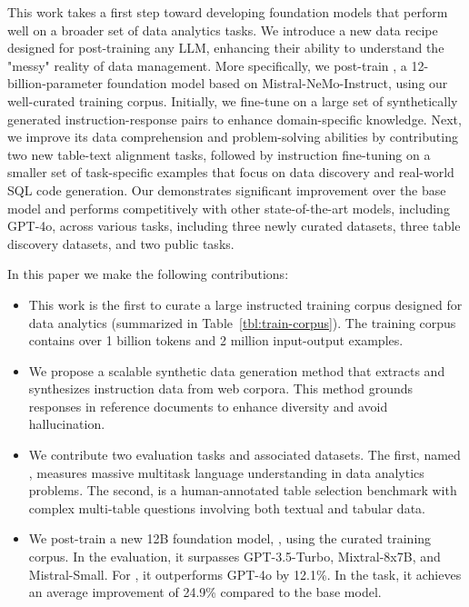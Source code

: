 This work takes a first step toward developing foundation models that perform well on a broader set of data analytics tasks. 
We introduce a new data recipe designed for post-training any LLM, enhancing their ability to understand the "messy" reality of data management. More specifically, we post-train \modelname, a 12-billion-parameter foundation model based on Mistral-NeMo-Instruct, using our well-curated training corpus. Initially, we fine-tune \modelname on a large set of synthetically generated instruction-response pairs to enhance domain-specific knowledge. Next, we improve its data comprehension and problem-solving abilities by contributing two new table-text alignment tasks, followed by instruction fine-tuning on a smaller set of task-specific examples that focus on data discovery and real-world SQL code generation. Our \modelname demonstrates significant improvement over the base model and performs competitively with other state-of-the-art models, including GPT-4o, across various tasks, including three newly curated \mmlu datasets, three table discovery datasets, and two public \texttosql tasks. 


\newpage
\noindent In this paper we make the following contributions:
\vspace{-3mm}
\begin{itemize}
    \item This work is the first to curate a large instructed training corpus designed for data analytics (summarized in Table~\ref{tbl:train-corpus}). The training corpus contains over 1 billion tokens and 2 million input-output examples.
    \item We propose a scalable synthetic data generation method that extracts and synthesizes instruction data from web corpora. This method grounds responses in reference documents to enhance diversity and avoid hallucination.
    \item We contribute two evaluation tasks and associated datasets. The first, named \mmlu, measures massive multitask language understanding in data analytics problems. The second, \wikipage is a human-annotated table selection benchmark with complex multi-table questions involving both textual and tabular data.
    \item We post-train a new 12B foundation model, \modelname, using the curated training corpus. 
    In the \mmlu evaluation, it surpasses GPT-3.5-Turbo, Mixtral-8x7B, and Mistral-Small. For \datadiscovery, it outperforms GPT-4o by 12.1\%. In the \texttosql task, it achieves an average improvement of 24.9\% compared to the base model.
    \vspace{-2mm}
\end{itemize}


